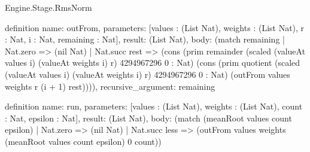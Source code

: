 \begin{lexlean}{Engine.Stage.RmsNorm}
\begin{semanticmodule}
definition{
  name: outFrom,
  parameters: [values : (List Nat), weights : (List Nat), r : Nat, i : Nat, remaining : Nat],
  result: (List Nat),
  body: (match remaining
    | Nat.zero => (nil Nat)
    | Nat.succ rest => (cons (prim remainder (scaled (valueAt values i) (valueAt weights i) r) 4294967296 0 : Nat) (cons (prim quotient (scaled (valueAt values i) (valueAt weights i) r) 4294967296 0 : Nat) (outFrom values weights r (i + 1) rest)))),
  recursive_argument: remaining
}

definition{
  name: run,
  parameters: [values : (List Nat), weights : (List Nat), count : Nat, epsilon : Nat],
  result: (List Nat),
  body: (match (meanRoot values count epsilon)
    | Nat.zero => (nil Nat)
    | Nat.succ less => (outFrom values weights (meanRoot values count epsilon) 0 count))
}
\end{semanticmodule}
\end{lexlean}
